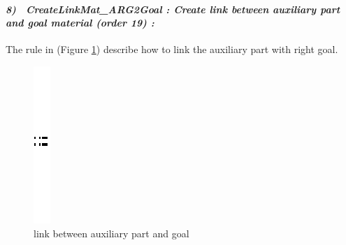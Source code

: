 \paragraph{\emph{8)~ CreateLinkMat_ARG2Goal : Create link between auxiliary part and  goal material  (order 19) :} }
 
 
The rule in (Figure \ref{fig:link between auxiliary part and goal})  describe 
how to link the auxiliary part with right goal.  


\begin{figure}[th]
\centering

	\quad{}\quad{}
		\includegraphics{ch3/img/sep}
	\quad{}\quad{}
  
\caption{\label{fig:link between auxiliary part and goal}link between auxiliary part and goal}
 
\end{figure}
